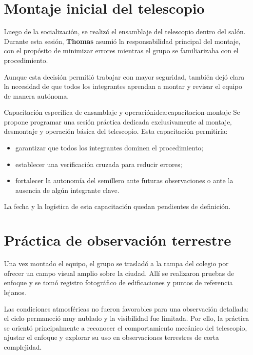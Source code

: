\section{Montaje inicial del telescopio}

Luego de la socialización, se realizó el ensamblaje del telescopio dentro del salón.
Durante esta sesión, \textbf{Thomas} asumió la responsabilidad principal del montaje,
con el propósito de minimizar errores mientras el grupo se familiarizaba con el
procedimiento.

Aunque esta decisión permitió trabajar con mayor seguridad, también dejó clara la
necesidad de que todos los integrantes aprendan a montar y revisar el equipo de manera
autónoma.

\begin{idea}{Capacitación específica de ensamblaje y operación}{idea:capacitacion-montaje}
    Se propone programar una sesión práctica dedicada exclusivamente al montaje,
    desmontaje y operación básica del telescopio. Esta capacitación permitiría:
    \begin{itemize}[leftmargin=1.5em]
        \item garantizar que todos los integrantes dominen el procedimiento;
        \item establecer una verificación cruzada para reducir errores;
        \item fortalecer la autonomía del semillero ante futuras observaciones o ante
              la ausencia de algún integrante clave.
    \end{itemize}
    La fecha y la logística de esta capacitación quedan pendientes de definición.
\end{idea}

\section{Práctica de observación terrestre}

Una vez montado el equipo, el grupo se trasladó a la rampa del colegio por ofrecer un
campo visual amplio sobre la ciudad. Allí se realizaron pruebas de enfoque y se tomó
registro fotográfico de edificaciones y puntos de referencia lejanos.

Las condiciones atmosféricas no fueron favorables para una observación detallada:
el cielo permaneció muy nublado y la visibilidad fue limitada. Por ello, la práctica
se orientó principalmente a reconocer el comportamiento mecánico del telescopio,
ajustar el enfoque y explorar su uso en observaciones terrestres de corta complejidad.

